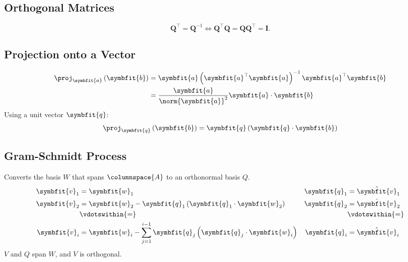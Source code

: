 \documentclass{article}
\begin{document}
\begin{multicols*}{3}
    \subsection{Orthogonal Matrices}
    \begin{equation*}
        \symbf{Q}^\top = \symbf{Q}^{-1}
        \iff
        \symbf{Q}^\top \symbf{Q} = \symbf{Q}\symbf{Q}^\top = \symbf{I}.
    \end{equation*}
    \subsection{Projection onto a Vector}
    \begin{align*}
        \proj_{\symbfit{a}} \left( \symbfit{b} \right) & = \symbfit{a} \left( \symbfit{a}^\top \symbfit{a} \right)^{-1} \symbfit{a}^\top \symbfit{b} \\
                                                       & = \frac{\symbfit{a}}{\norm{\symbfit{a}}^2} \symbfit{a} \cdot \symbfit{b}
    \end{align*}
    Using a unit vector \(\symbfit{q}\):
    \begin{equation*}
        \proj_{\symbfit{q}} \left( \symbfit{b} \right) = \symbfit{q} \left( \symbfit{q} \cdot \symbfit{b} \right)
    \end{equation*}
    \subsection{Gram-Schmidt Process}
    Converts the basis \(W\) that spans \(\columnspace{A}\) to an orthonormal basis \(Q\).
    \begin{align*}
        \symbfit{v}_1 & = \symbfit{w}_1                                                                                       & \symbfit{q}_1 & = \hat{\symbfit{v}}_1 \\
        \symbfit{v}_2 & = \symbfit{w}_2 - \symbfit{q}_1 \left( \symbfit{q}_1 \cdot \symbfit{w}_2 \right)                      & \symbfit{q}_2 & = \hat{\symbfit{v}}_2 \\
                      & \vdotswithin{=}                                                                                       &               & \vdotswithin{=}       \\
        \symbfit{v}_i & = \symbfit{w}_i - \sum_{j = 1}^{i - 1} \symbfit{q}_j \left( \symbfit{q}_j \cdot \symbfit{w}_i \right) & \symbfit{q}_i & = \hat{\symbfit{v}}_i
    \end{align*}
    \(V\) and \(Q\) span \(W\), and \(V\) is orthogonal.

\end{multicols*}
\end{document}
